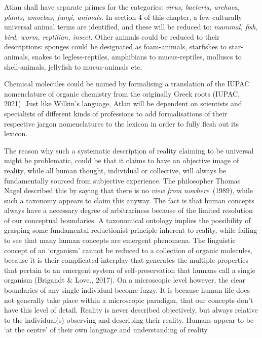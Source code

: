 Atlan shall have separate primes for the categories: \textit{virus, bacteria, archaea, plants, amoebas, fungi, animals.} In section 4 of this chapter, a few culturally universal animal terms are identified, and these will be reduced to: \textit{mammal, fish, bird, worm, reptilian, insect.} Other animals could be reduced to their descriptions: sponges could be designated as foam-animals, starfishes to star-animals, snakes to legless-reptiles, amphibians to mucus-reptiles, molluscs to shell-animals, jellyfish to mucus-animals etc.  


Chemical molecules could be named by formalising a translation of the IUPAC nomenclature of organic chemistry from the originally Greek roots (IUPAC, 2021). Just like Wilkin’s language, Atlan will be dependent on scientists and specialists of different kinds of professions to add formalisations of their respective jargon nomenclatures to the lexicon in order to fully flesh out its lexicon. 

The reason why such a systematic description of reality claiming to be universal might be problematic, could be that it claims to have an objective image of reality, while all human thought, individual or collective, will always be fundamentally sourced from subjective experience. The philosopher Thomas Nagel described this by saying that there is no \textit{view from nowhere}\ (1989), while such a taxonomy appears to claim this anyway. The fact is that human concepts always have a necessary degree of arbitrariness because of the limited resolution of our conceptual boundaries. A taxonomical ontology implies the possibility of grasping some fundamental reductionist principle inherent to reality, while failing to see that many human concepts are emergent phenomena. The linguistic concept of an ‘organism’ cannot be reduced to a collection of organic molecules, because it is their complicated interplay that generates the multiple properties that pertain to an emergent system of self-preservation that humans call a single organism (Brigandt \& Love., 2017). On a microscopic level however, the clear boundaries of any single individual become fuzzy. It is because human life does not generally take place within a microscopic paradigm, that our concepts don’t have this level of detail. Reality is never described objectively, but always relative to the individual(s) observing and describing their reality. Humans appear to be ‘at the centre’ of their own language and understanding of reality. 

